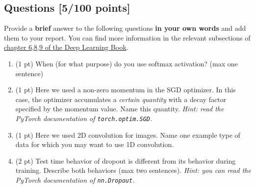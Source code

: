 \documentclass[a4paper,11pt]{article}
\begin{document}
\subsection{Questions [5/100 points]}
Provide a \textbf{brief} answer to the following questions \textbf{in your own words} and add them to your report. You can find more information in the relevant subsections of \href{https://www.deeplearningbook.org/}{chapter 6,8,9 of the Deep Learning Book}.
\begin{enumerate}
\item (1 pt) When (for what purpose) do you use softmax activation? (max one sentence)
\item (1 pt) Here we used a non-zero momentum in the SGD optimizer. In this case, the optimizer accumulates a \textit{certain quantity} with a decay factor specified by the momentum value. Name this quantity. \textit{Hint: read the PyTorch documentation of \texttt{torch.optim.SGD}.}
\item (1 pt) Here we used 2D convolution for images. Name one example type of data for which you may want to use 1D convolution. 
\item (2 pt) Test time behavior of dropout is different from its behavior during training. Describe both behaviors (max two sentences).
\textit{Hint: you can read the PyTorch documentation of \texttt{nn.Dropout}.}
\end{enumerate}

\end{document}

